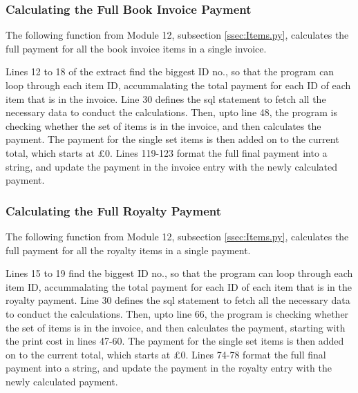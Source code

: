 \subsubsection{Calculating the Full Book Invoice Payment}
The following function from Module 12, subsection \ref{ssec:Items.py}, calculates the full payment for all the book invoice items in a single invoice.
\begin{tiny}
\end{tiny} 
Lines 12 to 18 of the extract find the biggest ID no., so that the program can loop through each item ID, accummalating the total payment for each ID of each item that is in the invoice. Line 30 defines the sql statement to fetch all the necessary data to conduct the calculations. Then, upto line 48, the program is checking whether the set of items is in the invoice, and then calculates the payment. The payment for the single set items is then added on to the current total, which starts at £0. Lines 119-123 format the full final payment into a string, and update the payment in the invoice entry with the newly calculated payment.


\subsubsection{Calculating the Full Royalty Payment}
The following function from Module 12, subsection \ref{ssec:Items.py}, calculates the full payment for all the royalty items in a single payment.
\begin{tiny}
\end{tiny}
Lines 15 to 19 find the biggest ID no., so that the program can loop through each item ID, accummalating the total payment for each ID of each item that is in the royalty payment. Line 30 defines the sql statement to fetch all the necessary data to conduct the calculations. Then, upto line 66, the program is checking whether the set of items is in the invoice, and then calculates the payment, starting with the print cost in lines 47-60. The payment for the single set items is then added on to the current total, which starts at £0. Lines 74-78 format the full final payment into a string, and update the payment in the royalty entry with the newly calculated payment.


